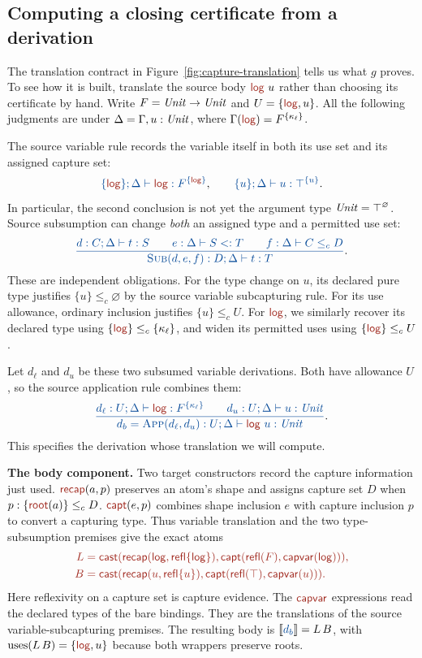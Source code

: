 \subsection*{Computing a closing certificate from a derivation}
The translation contract in Figure~\ref{fig:capture-translation} tells us
what $g$ proves. To see how it is built, translate the source body
$\ev{log}\ u$ rather than choosing its certificate by hand.
Write $F=\mathit{Unit}\to\mathit{Unit}$ and $U=\{\ev{log},u\}$.
All the following judgments are under
$\Delta=\Gamma,u:\mathit{Unit}$, where
$\Gamma(\ev{log})=F^{\{\kappa_\ell\}}$.

The source variable rule records the variable itself in both its use set
and its assigned capture set:
\[
 \src{\{\ev{log}\};\Delta\vdash\ev{log}:F^{\{\ev{log}\}}},
 \qquad
 \src{\{u\};\Delta\vdash u:\top^{\{u\}}}.
\]
In particular, the second conclusion is not yet the argument type
$\mathit{Unit}=\top^\varnothing$. Source subsumption can change
\emph{both} an assigned type and a permitted use set:
\[
 \src{\frac{d:C;\Delta\vdash t:S\qquad e:\Delta\vdash S<:T
                    \qquad f:\Delta\vdash C\le_c D}
           {\textsc{Sub}(d,e,f):D;\Delta\vdash t:T}}.
\]
These are independent obligations. For the type change on $u$, its
declared pure type justifies $\{u\}\le_c\varnothing$ by the source
variable subcapturing rule. For its use allowance, ordinary inclusion
justifies $\{u\}\le_c U$. For $\ev{log}$, we similarly recover its
declared type using $\{\ev{log}\}\le_c\{\kappa_\ell\}$, and widen its
permitted uses using $\{\ev{log}\}\le_c U$.

Let $d_\ell$ and $d_u$ be these two subsumed variable derivations.
Both have allowance $U$, so the source application rule combines them:
\[
 \src{\frac{d_\ell:U;\Delta\vdash\ev{log}:F^{\{\kappa_\ell\}}
                   \qquad d_u:U;\Delta\vdash u:\ty{Unit}}
           {d_b=\textsc{App}(d_\ell,d_u):
                      U;\Delta\vdash\ev{log}\ u:\ty{Unit}}}.
\]
This specifies the derivation whose translation we will compute.

\textbf{The body component.}
Two target constructors record the capture information just used.
$\ev{recap}(a,p)$ preserves an atom's shape and assigns capture set
$D$ when $p:\{\ev{root}(a)\}\le_c D$.
$\ev{capt}(e,p)$ combines shape inclusion $e$ with capture inclusion
$p$ to convert a capturing type. Thus variable translation and the two
type-subsumption premises give the exact atoms
\[
\tgt{\begin{aligned}
 L&=\cast{\ev{recap}(\ev{log},\ev{refl}\{\ev{log}\})}
          {\ev{capt}(\ev{refl}(F),\ev{capvar}(\ev{log}))},\\
 B&=\cast{\ev{recap}(u,\ev{refl}\{u\})}
          {\ev{capt}(\ev{refl}(\top),\ev{capvar}(u))}.
\end{aligned}}
\]
Here reflexivity on a capture set is capture evidence.
The $\ev{capvar}$ expressions read the declared types of the bare
bindings. They are the translations of the source variable-subcapturing
premises. The resulting body is $\tr{d_b}=L\,B$, with
$\uses{L\,B}=\{\ev{log},u\}$ because both wrappers preserve roots.

